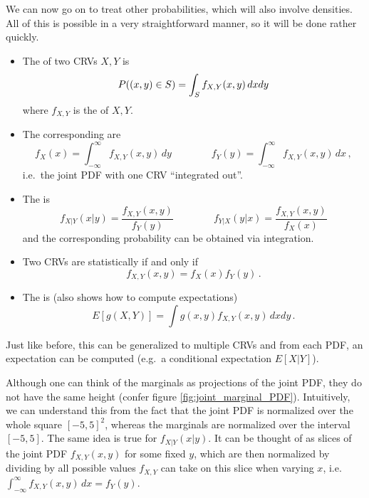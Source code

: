We can now go on to treat other probabilities, which will also involve densities. All of this is possible in a very straightforward manner, so it will be done rather quickly.
\begin{defi}
\begin{itemize}
\item The  of two CRVs $X, Y$ is
\begin{equation}
P\qty((x, y) \in S) = \int_S f_{X, Y}(x, y) \, dx dy
\end{equation}
where $f_{X, Y}$ is the  of $X, Y$.


\item The corresponding  are
\begin{equation}
f_X(x) = \int_{- \infty}^\infty f_{X, Y}(x, y) \, dy \qquad \qquad f_Y(y) = \int_{- \infty}^\infty f_{X, Y}(x, y) \, dx \, ,
\end{equation}
i.e.~the joint PDF with one CRV \enquote{integrated out}.


\item The  is
\begin{equation}\label{eq:joint_pdf}
f_{X | Y}(x | y) = \frac{f_{X, Y}(x, y)}{f_Y(y)} \qquad \qquad f_{Y | X}(y | x) = \frac{f_{X, Y}(x, y)}{f_X(x)}
\end{equation}
and the corresponding probability can be obtained via integration.\footnotemark


\item Two CRVs are statistically  if and only if
\begin{equation}
f_{X, Y}(x, y) = f_X(x) f_Y(y) \, .
\end{equation}


\item The  is (also shows how to compute expectations)
\begin{equation}\label{eq:unc_stat_crv}
E[g(X, Y)] = \int g(x, y) f_{X, Y}(x, y) \, dx dy \, .
\end{equation}
\end{itemize}

Just like before, this can be generalized to multiple CRVs and from each PDF, an expectation can be computed (e.g.~a conditional expectation $E[X | Y]$).
\end{defi}
Although one can think of the marginals as projections of the joint PDF, they do not have the same height (confer figure \ref{fig:joint_marginal_PDF}). Intuitively, we can understand this from the fact that the joint PDF is normalized over the whole square $[-5, 5]^2$, whereas the marginals are normalized over the interval $[-5, 5]$. The same idea is true for $f_{X | Y}(x | y)$. It can be thought of as slices of the joint PDF $f_{X, Y}(x, y)$ for some fixed $y$, which are then normalized by dividing by all possible values $f_{X, Y}$ can take on this slice when varying $x$, i.e.~$\int_{- \infty}^\infty f_{X, Y}(x, y) \, dx = f_Y(y)$.



